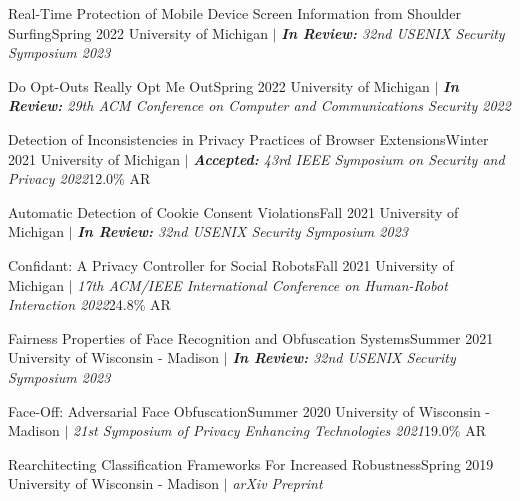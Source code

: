 
    \CVSubheading
      {{Real-Time Protection of Mobile Device Screen Information from Shoulder Surfing}\cite{ShoulderSurfing}}{Spring 2022}
      {{University of Michigan} $|$ \emph{\small{\textbf{In Review:} 32nd USENIX Security Symposium 2023}}}{}

    \CVSubheading
      {{Do Opt-Outs Really Opt Me Out}\cite{OptOutChk}}{Spring 2022}
      {{University of Michigan} $|$ \emph{\small{\textbf{In Review:} 29th ACM Conference on Computer and Communications Security 2022}}}{}

    \CVSubheading
      {{Detection of Inconsistencies in Privacy Practices of Browser Extensions}\cite{BrowserExtensions}}{Winter 2021}
      {{University of Michigan} $|$ \emph{\small{\textbf{Accepted:} 43rd IEEE Symposium on Security and Privacy 2022}}}{12.0\% AR}

    \CVSubheading
      {{Automatic Detection of Cookie Consent Violations}\cite{ConsentChk}}{Fall 2021}
      {{University of Michigan} $|$ \emph{\small{\textbf{In Review:} 32nd USENIX Security Symposium 2023}}}{}

    \CVSubheading
      {{Confidant: A Privacy Controller for Social Robots}\cite{HRIPrivacy}}{Fall 2021}
      {{University of Michigan} $|$ \emph{\small{17th ACM/IEEE International Conference on Human-Robot Interaction 2022}}}{24.8\% AR}
      
      
      
    \CVSubheading
      {{Fairness Properties of Face Recognition and Obfuscation Systems}\cite{Fairness}}{Summer 2021}
      {{University of Wisconsin - Madison} $|$ \emph{\small{\textbf{In Review:} 32nd USENIX Security Symposium 2023}}}{}

    \CVSubheading
      {{Face-Off: Adversarial Face Obfuscation}\cite{FaceOff}}{Summer 2020}
      {{University of Wisconsin - Madison} $|$ \emph{\small{21st Symposium of Privacy Enhancing Technologies 2021}}}{19.0\% AR}


    \CVSubheading
      {{Rearchitecting Classification Frameworks For Increased Robustness}\cite{Robustness}}{Spring 2019}
      {{University of Wisconsin - Madison} $|$ \emph{\small{arXiv Preprint}}}{}

  \CVSubHeadingListEnd